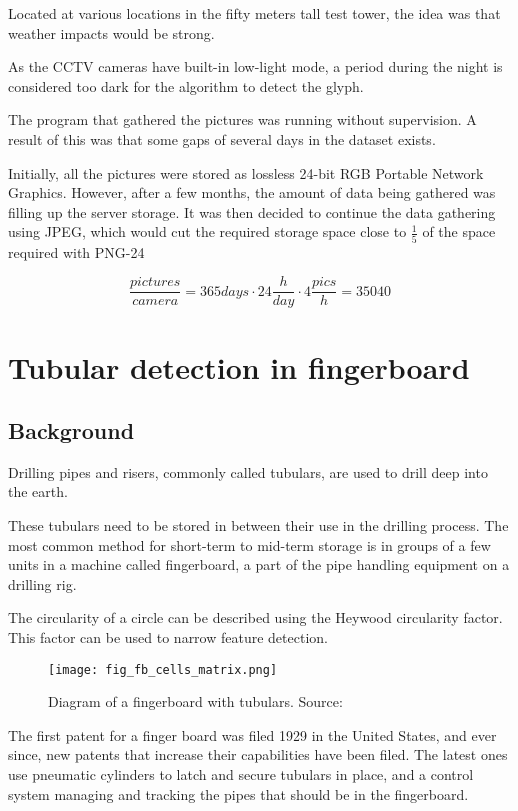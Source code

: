 Located at various locations in the fifty meters tall test tower, the idea was that weather impacts would be strong.

As the CCTV cameras have built-in low-light mode, a period during the night is considered too dark for the algorithm to detect the glyph.

The program that gathered the pictures was running without supervision. A result of this was that some gaps of several days in the dataset exists.

Initially, all the pictures were stored as lossless 24-bit RGB Portable Network Graphics. However, after a few months, the amount of data being gathered was filling up the server storage. It was then decided to continue the data gathering using JPEG, which would cut the required storage space close to $\frac{1}{5}$ of the space required with PNG-24

\begin{equation}
\frac{pictures}{camera}=365 days\cdot 24\frac{h}{day}\cdot 4\frac{pics}{h}=35040
\end{equation}

\section{Tubular detection in fingerboard}
\subsection{Background}
Drilling pipes and risers, commonly called tubulars, are used to drill deep into the earth.

These tubulars need to be stored in between their use in the drilling process. The most common method for short-term to mid-term storage is in groups of a few units in a machine called fingerboard, a part of the pipe handling equipment on a drilling rig.

The circularity of a circle can be described using the Heywood circularity factor. This factor can be used to narrow feature detection.

\begin{figure}[ht]
    \centering
    \texttt{[image: fig\_fb\_cells\_matrix.png]}
    \caption{Diagram of a fingerboard with tubulars. Source:\cite{fig_fb_cells_matrix13}}
    \label{fig:fb_cells_matrix}
\end{figure}
\FloatBarrier

The first patent for a finger board was filed 1929 in the United States, and ever since, new patents that increase their capabilities have been filed. The latest ones use pneumatic cylinders to latch and secure tubulars in place, and a control system managing and tracking the pipes that should be in the fingerboard.

